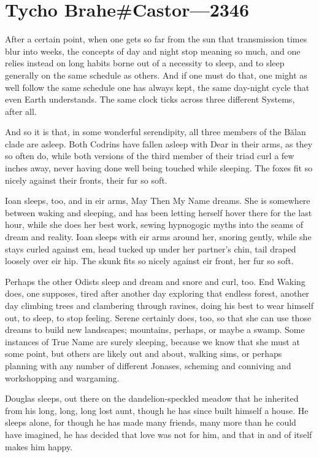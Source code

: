 \hypertarget{tycho-brahecastor-2346}{%
\chapter{Tycho Brahe\#Castor—2346}\label{tycho-brahecastor-2346}}

After a certain point, when one gets so far from the sun that transmission times blur into weeks, the concepts of day and night stop meaning so much, and one relies instead on long habits borne out of a necessity to sleep, and to sleep generally on the same schedule as others. And if one must do that, one might as well follow the same schedule one has always kept, the same day-night cycle that even Earth understands. The same clock ticks across three different Systems, after all.

And so it is that, in some wonderful serendipity, all three members of the Bălan clade are asleep. Both Codrins have fallen asleep with Dear in their arms, as they so often do, while both versions of the third member of their triad curl a few inches away, never having done well being touched while sleeping. The foxes fit so nicely against their fronts, their fur so soft.

Ioan sleeps, too, and in eir arms, May Then My Name dreams. She is somewhere between waking and sleeping, and has been letting herself hover there for the last hour, while she does her best work, sewing hypnogogic myths into the seams of dream and reality. Ioan sleeps with eir arms around her, snoring gently, while she stays curled against em, head tucked up under her partner's chin, tail draped loosely over eir hip. The skunk fits so nicely against eir front, her fur so soft.

Perhaps the other Odists sleep and dream and snore and curl, too. End Waking does, one supposes, tired after another day exploring that endless forest, another day climbing trees and clambering through ravines, doing his best to wear himself out, to sleep, to stop feeling. Serene certainly does, too, so that she can use those dreams to build new landscapes; mountains, perhaps, or maybe a swamp. Some instances of True Name are surely sleeping, because we know that she must at some point, but others are likely out and about, walking sims, or perhaps planning with any number of different Jonases, scheming and conniving and workshopping and wargaming.

Douglas sleeps, out there on the dandelion-speckled meadow that he inherited from his long, long, long lost aunt, though he has since built himself a house. He sleeps alone, for though he has made many friends, many more than he could have imagined, he has decided that love was not for him, and that in and of itself makes him happy.

